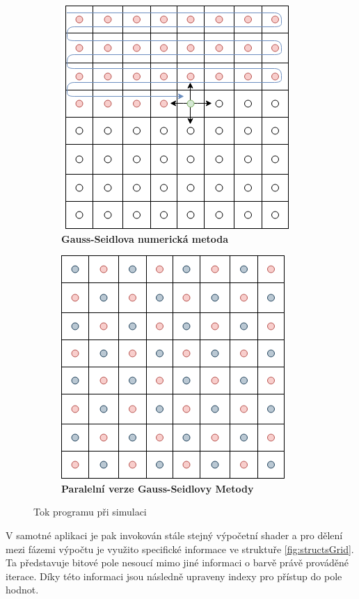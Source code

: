 \begin{figure}[h]
	\centering
	\begin{subfigure}[t]{.5\textwidth}
			\centering
        	\includegraphics[scale=0.5]{obrazky-figures/Gauss.png}
        	\caption{\textbf{Gauss-Seidlova numerická metoda}}
        	\label{fig:GaussSeidl}
	\end{subfigure}%
	\begin{subfigure}[t]{.5\textwidth}
		\centering
		\includegraphics[scale=0.5]{obrazky-figures/GaussRB.png}
		\caption{\textbf{Paralelní verze Gauss-Seidlovy Metody}}
		\label{fig:GaussSeildRB}
	\end{subfigure}
	\caption{Tok programu při simulaci}
	\label{fig:numGauss}
\end{figure}

V samotné aplikaci je pak invokován stále stejný výpočetní shader a pro dělení mezi fázemi výpočtu je využito specifické informace ve struktuře \ref{fig:structsGrid}. Ta představuje bitové pole nesoucí mimo jiné informaci o barvě právě prováděné iterace. Díky této informaci jsou následně upraveny indexy pro přístup do pole hodnot.

